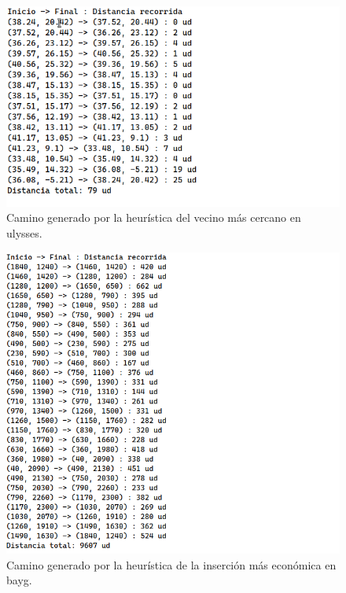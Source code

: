 \begin{figure}[H] 
  \centering
  \includegraphics[scale=0.5]{img/dist-vecino-ulysses.png}
  \caption{Camino generado por la heurística del vecino más cercano en ulysses.}
\end{figure}

\begin{figure}[H]
  \centering
  \includegraphics[scale=0.5]{img/dist-insercion-bayg.png}
  \caption{Camino generado por la heurística de la inserción más económica en bayg.}
\end{figure}

